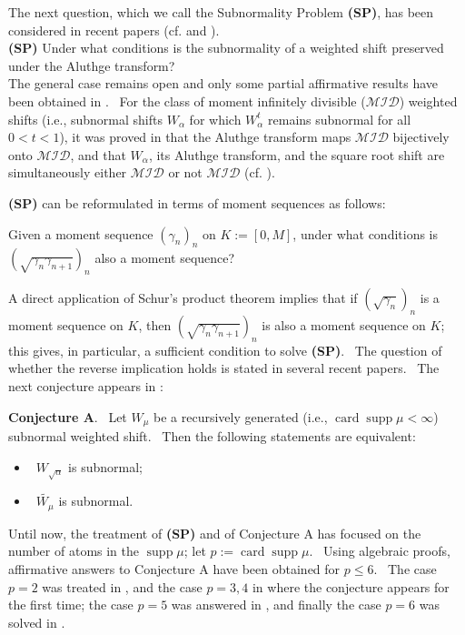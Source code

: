 \documentclass[12pt]{amsart}
\newcommand{\supp}{\operatorname{supp}}
\newcommand{\card}{\operatorname{card}}
\begin{document}
The next question, which we call the Subnormality Problem {\bf (SP)}, has been considered in recent papers (cf. \cite[Question 4.1]{exn} and \cite{brz, Curto2019,  SH, SH1}). \\

{\bf (SP)} Under what conditions is the subnormality  of a weighted shift preserved under the Aluthge transform?\\

 The general case remains open and only some partial affirmative results have been obtained in \cite{Curto2019, brz, SH, SH1}. \ For the class of moment infinitely divisible ($\mathcal{MID}$) weighted shifts (i.e., subnormal shifts $W_\alpha$ for which $W_\alpha^t$ remains subnormal for all $0<t<1$), it was proved in \cite{curt2} that the Aluthge transform maps $\mathcal{MID}$ bijectively onto $\mathcal{MID}$, and that $W_\alpha$, its Aluthge transform, and the square root shift are simultaneously either $\mathcal{MID}$ or not $\mathcal{MID}$ (cf. \cite[Corollary 4.7 and Theorem 4.10]{curt2}). \ 
 
 {\bf (SP)} can be reformulated in terms of moment sequences as follows: 
 
 Given a moment sequence $(\gamma_n)_n$ on $K:=[0,M]$, under what conditions is $(\sqrt{\gamma_n\gamma_{n+1}})_n$ also a moment sequence?

 A direct application of Schur's product theorem implies that if $(\sqrt{\gamma_n})_n$ is a moment sequence on $K$, then  $(\sqrt{\gamma_n\gamma_{n+1}})_n$ is also a moment sequence on $K$; this gives, in particular, a sufficient condition to solve {\bf (SP)}. \ The question of whether the reverse implication holds is stated in several recent papers. \ The  next conjecture  appears in \cite[Conjecture 4.6]{Curto2019}:

{\bf Conjecture A}. \ Let $W_\mu$ be a recursively generated (i.e., $\card \supp \mu < \infty$) subnormal weighted shift. \ Then the following statements are equivalent: 
\begin{itemize}
    \item[(i)] \ $W_{\sqrt{\alpha}}$ is subnormal;
    \item[(ii)] \ $\widetilde{ W_\mu}$ is subnormal.
\end{itemize}

\vspace{2pt}
Until now, the treatment of {\bf (SP)} and of Conjecture A has focused on the number of atoms in the $\supp \mu$; let $p:=\card \supp \mu$. \ Using algebraic proofs, affirmative answers to Conjecture A have been obtained for $p\le 6$. \ The case $p=2$ was treated in \cite{SH}, and the case $p=3,4$ in \cite{SH1} where the conjecture appears for the first time; the case $p=5$ was answered in \cite{Curto2019}, and finally the case $p=6$ was solved in \cite{EEEEE}.
\end{document}
